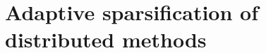 \chapter{Adaptive sparsification of distributed methods}\label{ch:soda}
\localtableofcontents*
\newpage




